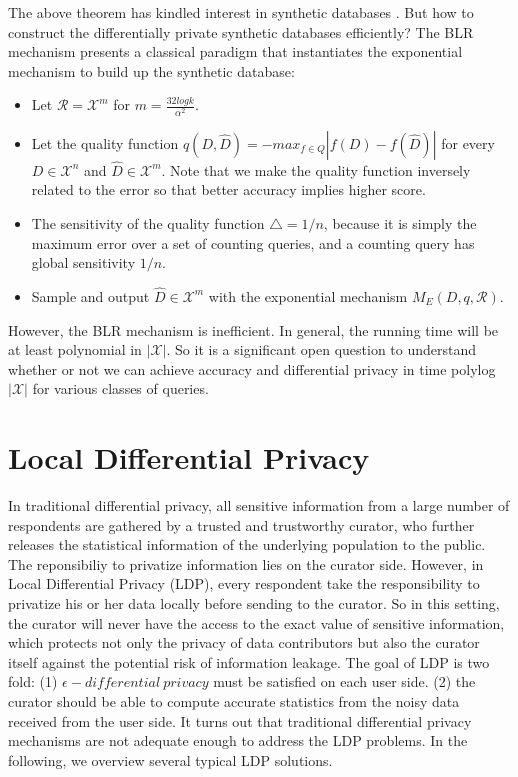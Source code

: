\documentclass[a4paper, 11pt]{article} %
\begin{document}
The above theorem has kindled interest in synthetic databases \cite{blum2013learning, dwork2009complexity}. But how to construct the differentially private synthetic databases efficiently? The BLR mechanism \cite{blum2013learning} presents a classical paradigm that instantiates the exponential mechanism to build up the synthetic database:
\begin{itemize}
\item Let $\mathcal{R} = \mathcal{X}^m$ for $m = \frac{32logk}{\alpha^2}$.
\item Let the quality function $q(D, \hat{D}) = -max_{f\in Q} | f(D) - f(\hat{D}) |$ for every $D \in \mathcal{X}^n$ and $\hat{D} \in \mathcal{X}^m$. Note that we make the quality function inversely related to the error so that better accuracy implies higher score.
\item The sensitivity of the quality function $\triangle = 1/n$, because it is simply the maximum error over a set of counting queries, and a counting query  has global sensitivity $1/n$.
\item Sample and output $\hat{D} \in \mathcal{X}^m$ with the exponential mechanism $M_E(D, q, \mathcal{R})$.
\end{itemize}
However, the BLR mechanism is inefficient. In general, the running time will be at least polynomial in $|\mathcal{X}|$. So it is a significant open question to understand whether or not we can achieve accuracy and differential privacy in time polylog $|\mathcal{X}|$ for various classes of queries.






\section{Local Differential Privacy}
In traditional differential privacy\cite{dwork2008differential}, all sensitive information from a large number of respondents are gathered by a trusted and trustworthy curator, who further releases the statistical information of the underlying population to the public. The reponsibiliy to privatize information lies on the curator side. However, in Local Differential Privacy (LDP)\cite{gupta2013privately,kasiviswanathan2011can}, every respondent take the responsibility to privatize his or her data locally before sending to the curator. So in this setting, the curator will never have the access to the exact value of sensitive information, which protects not only the privacy of data contributors but also the curator itself against the potential risk of information leakage. The goal of LDP is two fold: (1) $\epsilon - differential \ privacy$ must be satisfied on each user side. (2) the curator should be able to compute accurate statistics from the noisy data received from the user side. It turns out that traditional differential privacy mechanisms are not adequate enough to address the LDP problems. In the following, we overview several typical LDP solutions.
\end{document}
